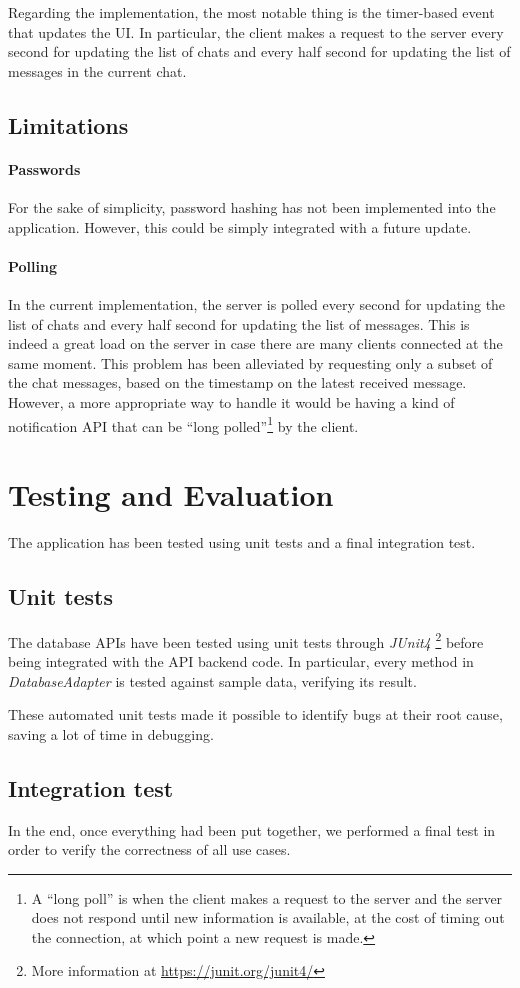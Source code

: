 \documentclass[10pt]{article}
\begin{document}
Regarding the implementation, the most notable thing is the timer-based event
that updates the UI. In particular, the client makes a request to the server
every second for updating the list of chats and every half second for updating 
the list of messages in the current chat.

\subsection{Limitations}
\paragraph{Passwords}
For the sake of simplicity, password hashing has not been implemented into the 
application. However, this could be simply integrated with a future update.

\paragraph{Polling}
In the current implementation, the server is polled every second for updating 
the list of chats and every half second for updating the list of messages. This 
is indeed a great load on the server in case there are many clients connected 
at the same moment. 
This problem has been alleviated by requesting only a subset of the chat 
messages, based on the timestamp on the latest received message.
However, 
a more appropriate way to handle it would be having a kind of notification API
that can be ``long polled''\footnote{A ``long poll'' is when the client 
makes a request to the server and the server does not respond until new 
information is available, at the cost of timing out the connection, at which 
point a new request is made.} by the client.

\clearpage
\section{Testing and Evaluation}
The application has been tested using unit tests and a final integration test.

\subsection{Unit tests}
The database APIs have been tested using unit tests through \emph{JUnit4}
\footnote{More information at \url{https://junit.org/junit4/}} before being 
integrated with the API backend code. In particular, every method in 
\emph{DatabaseAdapter} is tested against sample data, verifying its result.

These automated unit tests made it possible to identify bugs at their root cause,
saving a lot of time in debugging.

\subsection{Integration test}
In the end, once everything had been put together, we performed a final test 
in order to verify the correctness of all use cases.
\end{document}
